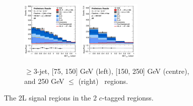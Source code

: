 \begin{figure}[h!]
\begin{subfigure}[b]{\textwidth}
        \includegraphics[width=0.32\textwidth]{Images/VH/Own_fit/postfit_VHcc/Region_distmva_BMax250_BMin150_DSR_J3_TTypext_incJet1_T2_L2_Y6051_GlobalFit_conditionnal_mu1.png}
        \includegraphics[width=0.32\textwidth]{Images/VH/Own_fit/postfit_VHcc/Region_distmva_BMin250_DSR_J3_TTypext_incJet1_T2_L2_Y6051_GlobalFit_conditionnal_mu1.png}
        \caption{$\geq$3-jet, [75, 150] GeV (left), [150, 250] GeV (centre), and 250  GeV $\leq$ (right) \ptv\ regions.}
        \label{fig:plots_VHcc_2L_SR_2c_3J}
    \end{subfigure}
    \caption{The 2L signal regions in the 2 $c$-tagged regionss.}
    \label{fig:plots_VHcc_2L_SR_2c}
\end{figure}
